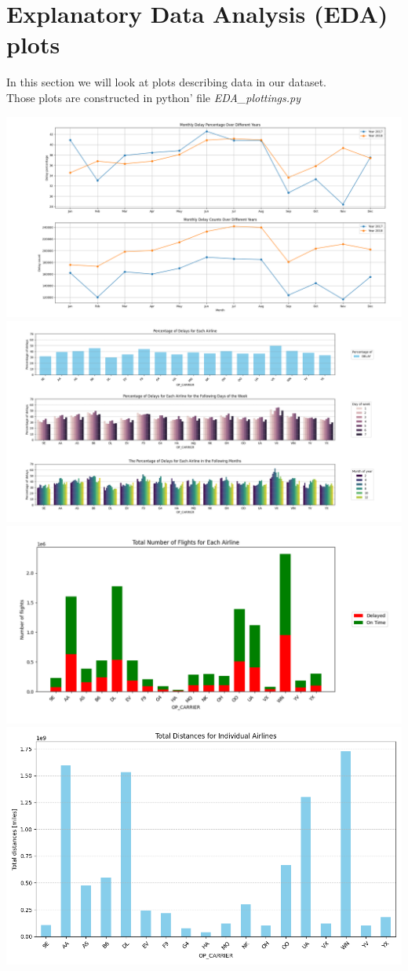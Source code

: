 \documentclass{article}
\begin{document}
\newpage
\section{Explanatory Data Analysis (EDA) plots}
In this section we will look at plots describing data in our dataset.\\
Those plots are constructed in python' file \textit{EDA\_plottings.py} 
	
	\includegraphics[scale=0.22]{plot1}
	\includegraphics[scale=0.25]{plot2}
	\includegraphics[scale=0.4]{plot3}
	\includegraphics[scale=0.4]{plot4}	
\end{document}
